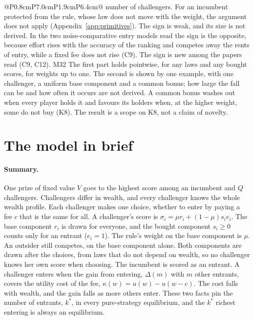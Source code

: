 \begin{longtable}{@{}P{0.8cm}P{7.0cm}P{1.9cm}P{6.4cm}@{}}
{  number of challengers. For an incumbent protected from the rule, whose law
  does not move with the weight, the argument does not apply
  (Appendix~\ref{app:primitives}). The sign is weak, and its size is not
  derived. In the two noise-comparative entry models read the sign is the
  opposite, because effort rises with the accuracy of the ranking and competes
  away the rents of entry, while a fixed fee does not rise (C9). The sign is
  new among the papers read (C9, C12).}
  {M32}
  {The first part holds pointwise, for any laws and any bought scores, for
  weights up to one. The second is shown by one example, with one challenger,
  a uniform base component and a common bonus; how large the fall can be and
  how often it occurs are not derived. A common bonus washes out when every
  player holds it and favours its holders when, at the higher weight, some do not buy (K8). The
  result is a scope on K8, not a claim of novelty.}
\end{longtable}
\normalsize

\section{The model in brief}
\label{sec:brief}

\paragraph{Summary.} One prize of fixed value $V$ goes to the highest score
among an incumbent and $Q$ challengers. Challengers differ in wealth, and every
challenger knows the whole wealth profile. Each challenger makes one choice,
whether to enter by paying a fee $c$ that is the same for all. A challenger's
score is $\sigma_i=\mu r_i+(1-\mu)s_ie_i$. The base component $r_i$ is drawn
for everyone, and the bought component $s_i\ge0$ counts only for an entrant
($e_i=1$). The rule's weight on the base component is $\mu$. An outsider still
competes, on the base component alone. Both components are drawn after the
choices, from laws that do not depend on wealth, so no challenger knows her own
score when choosing. The incumbent is scored as an entrant. A challenger enters
when the gain from entering, $\Delta(m)$ with $m$ other entrants, covers the
utility cost of the fee, $\kappa(w)=u(w)-u(w-c)$. The cost falls with wealth,
and the gain falls as more others enter. These two facts pin the number of
entrants, $k^*$, in every pure-strategy equilibrium, and the $k^*$ richest
entering is always an equilibrium.

